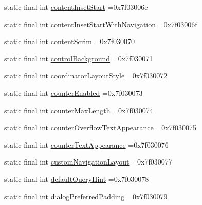 \begin{DoxyCompactItemize}
\item 
static final int \mbox{\hyperlink{classcom_1_1example_1_1trainawearapplication_1_1_r_1_1attr_a02127f541fe64c33dd59c3a4b7300c9a}{content\+Inset\+Start}} =0x7f03006e
\item 
static final int \mbox{\hyperlink{classcom_1_1example_1_1trainawearapplication_1_1_r_1_1attr_a90f3d3350051a6756ef81d61dc1bd6ad}{content\+Inset\+Start\+With\+Navigation}} =0x7f03006f
\item 
static final int \mbox{\hyperlink{classcom_1_1example_1_1trainawearapplication_1_1_r_1_1attr_a2d27644a908d59ead447e90f71fc0028}{content\+Scrim}} =0x7f030070
\item 
static final int \mbox{\hyperlink{classcom_1_1example_1_1trainawearapplication_1_1_r_1_1attr_ad225abaef3ccfc704fd2dedde613c85d}{control\+Background}} =0x7f030071
\item 
static final int \mbox{\hyperlink{classcom_1_1example_1_1trainawearapplication_1_1_r_1_1attr_a685b92bfe975ad1b8db7f44e2c3634cf}{coordinator\+Layout\+Style}} =0x7f030072
\item 
static final int \mbox{\hyperlink{classcom_1_1example_1_1trainawearapplication_1_1_r_1_1attr_a8e75f59b3b2d482dc5e6c6546e206cb0}{counter\+Enabled}} =0x7f030073
\item 
static final int \mbox{\hyperlink{classcom_1_1example_1_1trainawearapplication_1_1_r_1_1attr_a738a1bcf753c9d00c7d198edfc8ffd96}{counter\+Max\+Length}} =0x7f030074
\item 
static final int \mbox{\hyperlink{classcom_1_1example_1_1trainawearapplication_1_1_r_1_1attr_adbd448cc9d5deada4e2cbd14d65ab52b}{counter\+Overflow\+Text\+Appearance}} =0x7f030075
\item 
static final int \mbox{\hyperlink{classcom_1_1example_1_1trainawearapplication_1_1_r_1_1attr_abc088cec0bc3584a65ff813560170f4f}{counter\+Text\+Appearance}} =0x7f030076
\item 
static final int \mbox{\hyperlink{classcom_1_1example_1_1trainawearapplication_1_1_r_1_1attr_a9ff4e4df74a89300a537fc79d2e7ef70}{custom\+Navigation\+Layout}} =0x7f030077
\item 
static final int \mbox{\hyperlink{classcom_1_1example_1_1trainawearapplication_1_1_r_1_1attr_a85be8c2bf5291b70d9e7c15720f61b75}{default\+Query\+Hint}} =0x7f030078
\item 
static final int \mbox{\hyperlink{classcom_1_1example_1_1trainawearapplication_1_1_r_1_1attr_ac7793c2d1d4485b1f7282ba3b303f7a9}{dialog\+Preferred\+Padding}} =0x7f030079
\item 

\end{DoxyCompactItemize}
